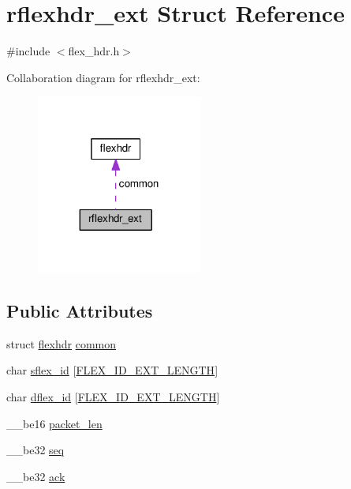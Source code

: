 \hypertarget{structrflexhdr__ext}{}\section{rflexhdr\+\_\+ext Struct Reference}
\label{structrflexhdr__ext}


{\ttfamily \#include $<$flex\+\_\+hdr.\+h$>$}



Collaboration diagram for rflexhdr\+\_\+ext\+:\nopagebreak
\begin{figure}[H]
\begin{center}
\leavevmode
\includegraphics[width=155pt]{structrflexhdr__ext__coll__graph}
\end{center}
\end{figure}
\subsection*{Public Attributes}
\begin{DoxyCompactItemize}
\item 
struct \hyperlink{structflexhdr}{flexhdr} \hyperlink{structrflexhdr__ext_ac57a5553651d7cdde22b2d00c0a916ce}{common}
\item 
char \hyperlink{structrflexhdr__ext_aba2b1333b35892ce3ae9c75dd8e2a521}{sflex\+\_\+id} \mbox{[}\hyperlink{flex__const_8h_a5bfdaffe9863d3fcfc3b90fa2a893bfd}{F\+L\+E\+X\+\_\+\+I\+D\+\_\+\+E\+X\+T\+\_\+\+L\+E\+N\+G\+TH}\mbox{]}
\item 
char \hyperlink{structrflexhdr__ext_a3e35c1161803908776955800eb2ad3fe}{dflex\+\_\+id} \mbox{[}\hyperlink{flex__const_8h_a5bfdaffe9863d3fcfc3b90fa2a893bfd}{F\+L\+E\+X\+\_\+\+I\+D\+\_\+\+E\+X\+T\+\_\+\+L\+E\+N\+G\+TH}\mbox{]}
\item 
\+\_\+\+\_\+be16 \hyperlink{structrflexhdr__ext_ac716297c579ced38da559cf53967f09b}{packet\+\_\+len}
\item 
\+\_\+\+\_\+be32 \hyperlink{structrflexhdr__ext_a240fcbc0eff91a233304845f516d75d8}{seq}
\item 
\+\_\+\+\_\+be32 \hyperlink{structrflexhdr__ext_aee0018851d2f3381fd99c405606731b4}{ack}
\end{DoxyCompactItemize}


